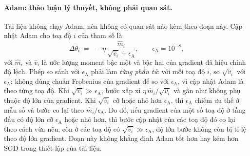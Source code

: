 \paragraph{Adam: thảo luận lý thuyết, không phải quan sát.} Tài liệu không chạy Adam, nên không có quan
sát nào kèm theo đoạn này. Cập nhật Adam cho toạ độ $i$ của tham số là
\[
  \Delta\theta_i \;=\; -\,\eta\,\frac{\hat m_i}{\sqrt{\hat v_i}+\epsilon_{\mathrm{A}}},
  \qquad \epsilon_{\mathrm{A}}=10^{-8},
\]
với $\hat m_i$ và $\hat v_i$ là ước lượng moment bậc một và bậc hai của gradient đã hiệu chỉnh độ lệch.
Phép so sánh với $\epsilon_{\mathrm{A}}$ phải làm \emph{từng phần tử}: với mỗi toạ độ $i$, so $\sqrt{\hat v_i}$ với
$\epsilon_{\mathrm{A}}$; không dùng chuẩn Frobenius của gradient để so với $\epsilon_{\mathrm{A}}$, vì cập nhật Adam
là theo từng toạ độ. Khi $\sqrt{\hat v_i}\gg\epsilon_{\mathrm{A}}$, bước xấp xỉ $\eta\,\hat m_i/\sqrt{\hat v_i}$ và gần như không
phụ thuộc độ lớn của gradient. Khi $\sqrt{\hat v_i}$ cỡ hoặc nhỏ hơn $\epsilon_{\mathrm{A}}$, thì $\epsilon_{\mathrm{A}}$ chiếm ưu
thế ở mẫu số và bước co lại theo $\hat m_i/\epsilon_{\mathrm{A}}$. Do đó, nếu gradient của một số toạ độ ở tầng
đầu có độ lớn cỡ $\epsilon_{\mathrm{A}}$ hoặc nhỏ hơn, thì bước cập nhật của các toạ độ đó co lại theo cách vừa
nêu; còn ở các toạ độ có $\sqrt{\hat v_i}\gg\epsilon_{\mathrm{A}}$, độ lớn bước không còn bị tỉ lệ theo độ lớn gradient. Đoạn này
không khẳng định Adam tốt hơn hay kém hơn SGD trong thiết lập của tài liệu.
